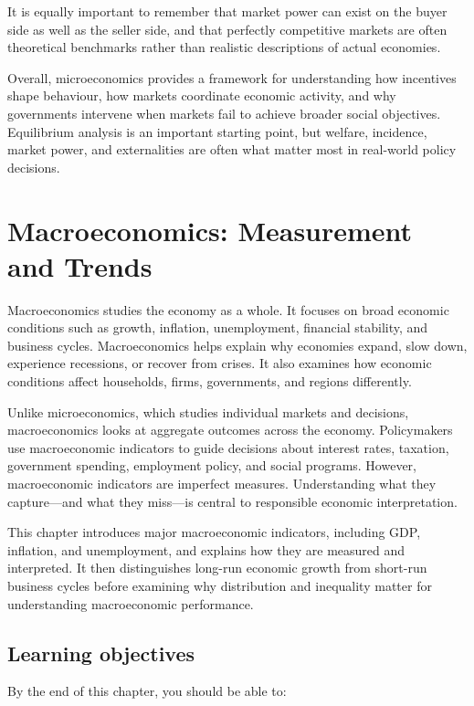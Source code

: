 \documentclass[
  11pt,
  oneside]{book}
\begin{document}
It is equally important to remember that market power can exist on the buyer side as well as the seller side, and that perfectly competitive markets are often theoretical benchmarks rather than realistic descriptions of actual economies.

Overall, microeconomics provides a framework for understanding how incentives shape behaviour, how markets coordinate economic activity, and why governments intervene when markets fail to achieve broader social objectives. Equilibrium analysis is an important starting point, but welfare, incidence, market power, and externalities are often what matter most in real-world policy decisions.

\chapter{Macroeconomics: Measurement and Trends}\label{macro}

Macroeconomics studies the economy as a whole. It focuses on broad economic conditions such as growth, inflation, unemployment, financial stability, and business cycles. Macroeconomics helps explain why economies expand, slow down, experience recessions, or recover from crises. It also examines how economic conditions affect households, firms, governments, and regions differently.

Unlike microeconomics, which studies individual markets and decisions, macroeconomics looks at aggregate outcomes across the economy. Policymakers use macroeconomic indicators to guide decisions about interest rates, taxation, government spending, employment policy, and social programs. However, macroeconomic indicators are imperfect measures. Understanding what they capture---and what they miss---is central to responsible economic interpretation.

This chapter introduces major macroeconomic indicators, including GDP, inflation, and unemployment, and explains how they are measured and interpreted. It then distinguishes long-run economic growth from short-run business cycles before examining why distribution and inequality matter for understanding macroeconomic performance.

\section{Learning objectives}\label{learning-objectives-2}

By the end of this chapter, you should be able to:
\end{document}
